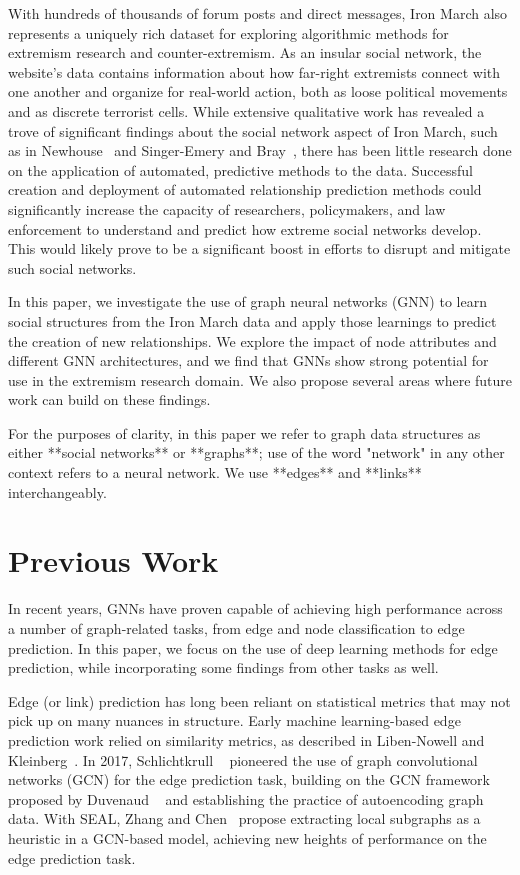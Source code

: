 \documentclass[10pt,twocolumn,letterpaper]{article}
\begin{document}
With hundreds of thousands of forum posts and direct messages, Iron March also represents a uniquely rich dataset for exploring algorithmic methods for extremism research and counter-extremism. As an insular social network, the website's data contains information about how far-right extremists connect with one another and organize for real-world action, both as loose political movements and as discrete terrorist cells. While extensive qualitative work has revealed a trove of significant findings about the social network aspect of Iron March, such as in Newhouse~\cite{ctc} and Singer-Emery and Bray~\cite{lawfare}, there has been little research done on the application of automated, predictive methods to the data. Successful creation and deployment of automated relationship prediction methods could significantly increase the capacity of researchers, policymakers, and law enforcement to understand and predict how extreme social networks develop. This would likely prove to be a significant boost in efforts to disrupt and mitigate such social networks. 

In this paper, we investigate the use of graph neural networks (GNN) to learn social structures from the Iron March data and apply those learnings to predict the creation of new relationships. We explore the impact of node attributes and different GNN architectures, and we find that GNNs show strong potential for use in the extremism research domain. We also propose several areas where future work can build on these findings.

For the purposes of clarity, in this paper we refer to graph data structures as either **social networks** or **graphs**; use of the word "network" in any other context refers to a neural network. We use **edges** and **links** interchangeably. 

\section{Previous Work}

In recent years, GNNs have proven capable of achieving high performance across a number of graph-related tasks, from edge and node classification to edge prediction. In this paper, we focus on the use of deep learning methods for edge prediction, while incorporating some findings from other tasks as well.

Edge (or link) prediction has long been reliant on statistical metrics that may not pick up on many nuances in structure. Early machine learning-based edge prediction work relied on similarity metrics, as described in Liben-Nowell and Kleinberg~\cite{linkpred2007}. In 2017, Schlichtkrull \etal~\cite{schlichtkrull2017modeling} pioneered the use of graph convolutional networks (GCN) for the edge prediction task, building on the GCN framework proposed by Duvenaud \etal~\cite{Duvenaud} and establishing the practice of autoencoding graph data. With SEAL, Zhang and Chen~\cite{SEAL} propose extracting local subgraphs as a heuristic in a GCN-based model, achieving new heights of performance on the edge prediction task.
\end{document}

